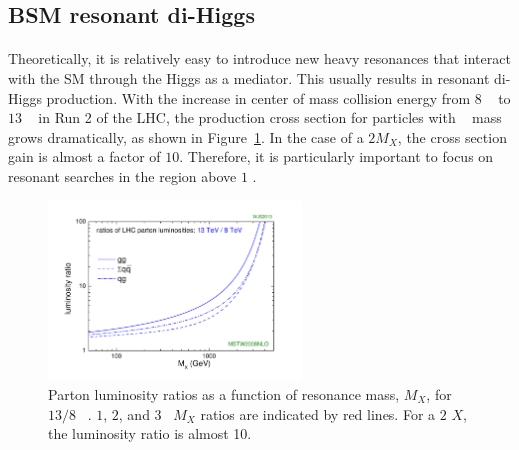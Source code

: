 \subsection{BSM resonant di-Higgs}
\paragraph{}
Theoretically, it is relatively easy to introduce new heavy resonances that interact with the SM through the Higgs as a mediator.
This usually results in resonant di-Higgs production. 
With the increase in center of mass collision energy from $8$ \TeV~ to $13$ \TeV~ in Run 2 of the LHC, the production cross section for particles with \TeV~ mass grows dramatically, as shown in Figure~\ref{fig:lumi_ratio}.
In the case of a $2$\TeV $M_X$, the cross section gain is almost a factor of $10$. 
Therefore, it is particularly important to focus on resonant searches in the region above $1$ \TeV.

\begin{figure}[htbp!]
  \centering
  \captionsetup{justification=centering}
  \includegraphics[width=0.6\textwidth]{figures/theory/lhclumi7813_2013_v1}
  \caption{Parton luminosity ratios as a function of resonance mass, $M_{X}$, for $13/8$ \TeV~\cite{LumiRatio}. $1$, $2$, and $3$ ~\TeV $M_{X}$ ratios are indicated by red lines. For a $2$ \TeV $X$, the luminosity ratio is almost 10.}
  \label{fig:lumi_ratio}
\end{figure}

